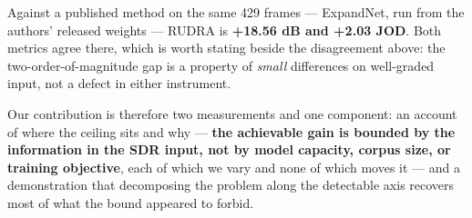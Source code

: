 Against a published method on the same 429 frames --- ExpandNet, run from the
authors' released weights --- RUDRA is \textbf{+18.56 dB and +2.03 JOD}. Both metrics
agree there, which is worth stating beside the disagreement above: the
two-order-of-magnitude gap is a property of \emph{small} differences on well-graded
input, not a defect in either instrument.

Our contribution is therefore two measurements and one component: an account of
where the ceiling sits and why --- \textbf{the achievable gain is bounded by the
information in the SDR input, not by model capacity, corpus size, or training
objective}, each of which we vary and none of which moves it --- and a
demonstration that decomposing the problem along the detectable axis recovers
most of what the bound appeared to forbid.

